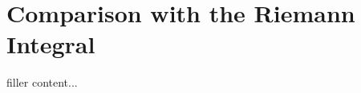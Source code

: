 \section{Comparison with the Riemann Integral}\label{sec:comparison-with-the-riemann-integral}

filler content...

